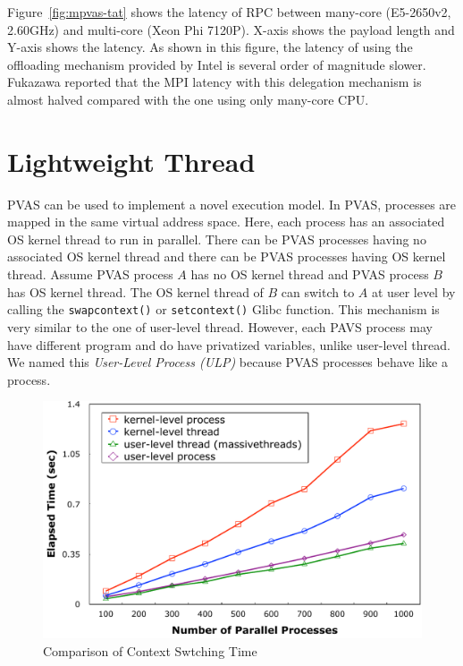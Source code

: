 Figure~\ref{fig:mpvas-tat} shows the latency of RPC between many-core
(E5-2650v2, 2.60GHz) and multi-core (Xeon Phi 7120P). X-axis shows the
payload length and Y-axis shows the latency. As shown in this figure,
the latency of using the offloading mechanism provided by Intel is
several order of magnitude slower. Fukazawa reported that the MPI
latency with this delegation mechanism is almost halved compared with
the one using only many-core 
CPU\cite{Sato:2014:DMP:2642769.2642795,fukazawa-thesis}. 

\section{Lightweight Thread}

PVAS can be used to implement a novel execution model. In PVAS,
processes are mapped in the same virtual address space. Here, each
process has an associated OS kernel thread to run in parallel. There
can be PVAS processes having no associated OS kernel thread and there
can be PVAS processes having OS kernel thread. Assume PVAS process $A$
has no OS kernel thread and PVAS process $B$ has OS kernel thread. The
OS kernel thread of $B$ can switch to $A$ at user level by calling
the {\tt swapcontext()} or {\tt setcontext()} Glibc function. This
mechanism is very similar to the one of user-level thread. However,
each PAVS process may have different program and do have privatized
variables, unlike user-level thread. 
We named this {\em User-Level Process (ULP)}
because PVAS processes behave like a process\cite{110009850784}.

\begin{figure}[ht]
\begin{center}
\includegraphics[width=0.8\columnwidth]{Figs/ULP-CTXSW.pdf}
  \caption{Comparison of Context Swtching Time}
  \label{fig:ulp-ctxsw}
\end{center}
\end{figure}


